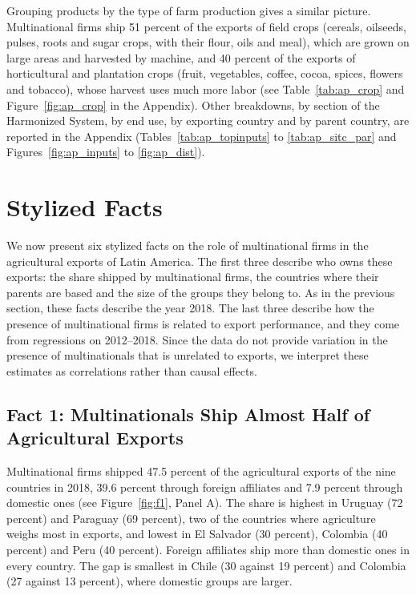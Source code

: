 \documentclass[11pt,a4paper]{article}
\begin{document}
Grouping products by the type of farm production gives a similar picture. Multinational firms ship
51 percent of the exports of field crops (cereals, oilseeds, pulses, roots and sugar crops, with
their flour, oils and meal), which are grown on large areas and harvested by machine, and 40 percent
of the exports of horticultural and plantation crops (fruit, vegetables, coffee, cocoa, spices,
flowers and tobacco), whose harvest uses much more labor (see Table~\ref{tab:ap_crop} and
Figure~\ref{fig:ap_crop} in the Appendix). Other breakdowns, by section of the Harmonized System,
by end use, by exporting country and by parent country, are reported in the Appendix
(Tables~\ref{tab:ap_topinputs} to \ref{tab:ap_sitc_par} and Figures~\ref{fig:ap_inputs}
to \ref{fig:ap_dist}).

\section{Stylized Facts}\label{sec:results}
We now present six stylized facts on the role of multinational firms in the agricultural exports of
Latin America. The first three describe who owns these exports: the share shipped by multinational
firms, the countries where their parents are based and the size of the groups they belong to. As in
the previous section, these facts describe the year 2018. The last three describe how the presence
of multinational firms is related to export performance, and they come from regressions on
2012--2018. Since the data do not provide variation in the presence of multinationals that is
unrelated to exports, we interpret these estimates as correlations rather than causal effects.

\subsection{Fact 1: Multinationals Ship Almost Half of Agricultural Exports}\label{sec:owners}

Multinational firms shipped 47.5 percent of the agricultural exports of the nine countries in 2018,
39.6 percent through foreign affiliates and 7.9 percent through domestic ones (see
Figure~\ref{fig:f1}, Panel A). The share is highest in Uruguay (72 percent) and Paraguay (69
percent), two of the countries where agriculture weighs most in exports, and lowest in El Salvador
(30 percent), Colombia (40 percent) and Peru (40 percent). Foreign affiliates ship more than
domestic ones in every country. The gap is smallest in Chile (30 against 19 percent) and Colombia
(27 against 13 percent), where domestic groups are larger.
\end{document}
